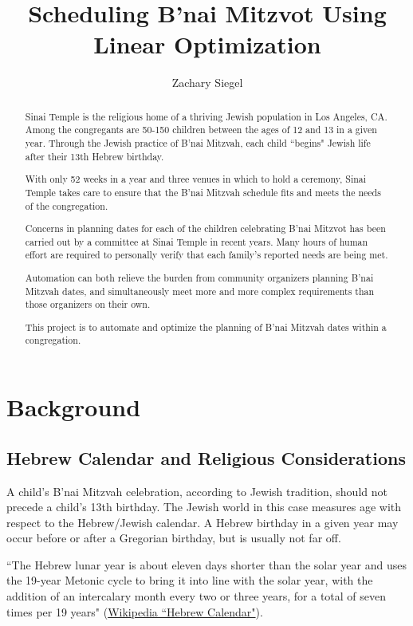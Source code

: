 \documentclass[11pt]{article}
\title{Scheduling B'nai Mitzvot Using Linear Optimization}
\author{Zachary Siegel}
\begin{document}
\maketitle

\begin{abstract}
Sinai Temple is the religious home of a thriving Jewish population in Los Angeles, CA. Among the congregants are 50-150 children between the ages of 12 and 13 in a given year. Through the Jewish practice of B'nai Mitzvah, each child ``begins" Jewish life after their 13th Hebrew birthday.

With only 52 weeks in a year and three venues in which to hold a ceremony, Sinai Temple takes care to ensure that the B'nai Mitzvah schedule fits and meets the needs of the congregation.

Concerns in planning dates for each of the children celebrating B'nai Mitzvot has been carried out by a committee at Sinai Temple in recent years. Many hours of human effort are required to personally verify that each family's reported needs are being met.

Automation can both relieve the burden from community organizers planning B'nai Mitzvah dates, and simultaneously meet more and more complex requirements than those organizers on their own.

This project is to automate and optimize the planning of B'nai Mitzvah dates within a congregation.

\end{abstract}

\section{Background}
\subsection{Hebrew Calendar and Religious Considerations} A child's B'nai Mitzvah celebration, according to Jewish tradition, should not precede a child's 13th birthday. The Jewish world in this case measures age with respect to the Hebrew/Jewish calendar. A Hebrew birthday in a given year may occur before or after a Gregorian birthday, but is usually not far off.

``The Hebrew lunar year is about eleven days shorter than the solar year and uses the 19-year Metonic cycle to bring it into line with the solar year, with the addition of an intercalary month every two or three years, for a total of seven times per 19 years" (\href{https://en.wikipedia.org/wiki/Hebrew_calendar}{Wikipedia ``Hebrew Calendar"}).
\end{document}

